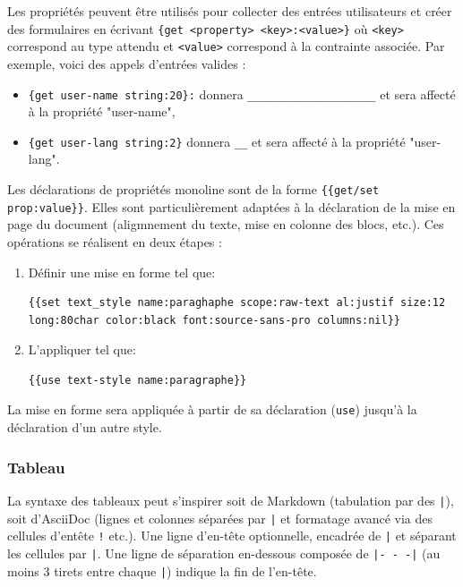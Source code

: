 \documentclass[a4paper,12pt]{article}
\begin{document}
Les propriétés peuvent être utilisés pour collecter des entrées utilisateurs et créer des formulaires en écrivant \texttt{\{get <property> <key>:<value>\}} où \texttt{<key>} correspond au type attendu et \texttt{<value>} correspond à la contrainte associée. Par exemple, voici des appels d'entrées valides :
\begin{itemize}
\item \texttt{\{get user-name string:20\}:} donnera \texttt{\_\_\_\_\_\_\_\_\_\_\_\_\_\_\_\_\_\_\_\_} et sera affecté à la propriété "user-name",
\item \texttt{\{get user-lang string:2\}} donnera \texttt{\_\_} et sera affecté à la propriété "user-lang".
\end{itemize}

Les déclarations de propriétés monoline sont de la forme \texttt{\{\{get/set prop:value\}\}}. Elles sont particulièrement adaptées à la déclaration de la mise en page du document (aligmnement du texte, mise en colonne des blocs, etc.). Ces opérations se réalisent en deux étapes : 
\begin{enumerate}
\item Définir une mise en forme tel que:
\begin{verbatim}
{{set text_style name:paraghaphe scope:raw-text al:justif size:12 long:80char color:black font:source-sans-pro columns:nil}}
\end{verbatim}
\item L'appliquer tel que:
\begin{verbatim}
{{use text-style name:paragraphe}}
\end{verbatim}
\end{enumerate}

La mise en forme sera appliquée à partir de sa déclaration (\texttt{use}) jusqu'à la déclaration d'un autre style.
\subsubsection{Tableau}
\label{sec:org98d6aae}

La syntaxe des tableaux peut s’inspirer soit de Markdown (tabulation par des \texttt{|}), soit d’AsciiDoc (lignes et colonnes séparées par \texttt{|} et formatage avancé via des cellules d’entête \texttt{!} etc.). 
Une ligne d’en-tête optionnelle, encadrée de \texttt{|} et séparant les cellules par \texttt{|}. Une ligne de séparation en-dessous composée de \texttt{|- - -|} (au moins 3 tirets entre chaque \texttt{|}) indique la fin de l’en-tête.
\end{document}
